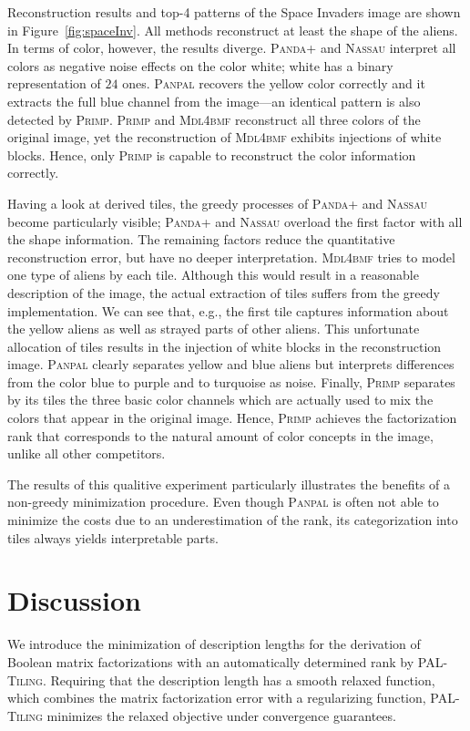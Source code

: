 Reconstruction results and top-4 patterns of the Space Invaders image are shown in Figure~\ref{fig:spaceInv}. All methods reconstruct at least the shape of the aliens. In terms of color, however, the results diverge. \textsc{Panda+} and \textsc{Nassau} interpret all colors as negative noise effects on the color white; white has a binary representation of $24$ ones. \textsc{Panpal} recovers the yellow color correctly and it extracts the full blue channel from the image---an identical pattern is also detected by \textsc{Primp}. \textsc{Primp} and \textsc{Mdl4bmf} reconstruct all three colors of the original image, yet the reconstruction of \textsc{Mdl4bmf} exhibits injections of white blocks. Hence, only \textsc{Primp} is capable to reconstruct the color information correctly. 

Having a look at derived tiles, the greedy processes of \textsc{Panda+} and \textsc{Nassau} become particularly visible; \textsc{Panda+} and \textsc{Nassau} overload the first factor with all the shape information. The remaining factors reduce the quantitative reconstruction error, but have no deeper interpretation. \textsc{Mdl4bmf} tries to model one type of aliens by each tile. Although this would result in a reasonable description of the image, the actual extraction of tiles suffers from the greedy implementation. We can see that, e.g., the first tile captures information about the yellow aliens as well as strayed parts of other aliens. This unfortunate allocation of tiles results in the injection of white blocks in the reconstruction image.  \textsc{Panpal} clearly separates yellow and blue aliens but interprets differences from the color blue to purple and to turquoise as noise. Finally, \textsc{Primp} separates by its tiles the three basic color channels which are actually used to mix the colors that appear in the original image. Hence, \textsc{Primp} achieves the factorization rank that corresponds to the natural amount of color concepts in the image, unlike all other competitors.

The results of this qualitive experiment particularly illustrates the benefits of a non-greedy minimization procedure. Even though \textsc{Panpal} is often not able to minimize the costs due to an underestimation of the rank, its categorization into tiles always yields interpretable parts.
\section{Discussion}
We introduce the minimization of description lengths for the derivation of Boolean matrix factorizations with an automatically determined rank by \textsc{PAL-Tiling}. Requiring that the description length has a smooth relaxed function, which combines the matrix factorization error with a regularizing function, \textsc{PAL-Tiling} minimizes the relaxed objective under convergence guarantees. %

